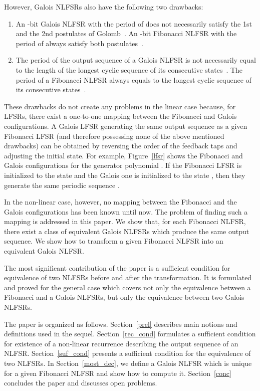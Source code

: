 \documentclass{llncs}
\begin{document}
However, Galois NLFSRs also have the following two drawbacks:
\begin{enumerate}
\item An -bit Galois NLFSR with the period of  does not 
necessarily satisfy the 1st and the 2nd postulates of
Golomb~\cite{DuTT08}. An -bit Fibonacci NLFSR with the period of
 always satisfy both postulates~\cite{Golomb_book}.
\item The period of the output sequence of a Galois NLFSR is not 
necessarily equal to the length of the longest cyclic sequence of its
consecutive states~\cite{DuTT08}. The period of a Fibonacci NLFSR always
equals to the longest cyclic sequence of its
consecutive states~\cite{Golomb_book}.
\end{enumerate}

These drawbacks do not create any problems in the linear
case because, for LFSRs, there exist a one-to-one mapping between 
the Fibonacci and Galois configurations. A Galois LFSR generating the
same output sequence as a given Fibonacci LFSR (and therefore
possessing none of the above mentioned drawbacks) can be obtained by
reversing the order of the feedback taps and adjusting the initial
state. For example, Figure~\ref{lfsr} shows the
Fibonacci and Galois configurations for the generator polynomial . If
the Fibonacci LFSR is initialized to the state  and the Galois
one is initialized to the state , then they generate the same
periodic sequence .

In the non-linear case, however, no mapping between the Fibonacci and
the Galois configurations has been known until now. The problem of
finding such a mapping is addressed in this paper.
We show that, for each Fibonacci NLFSR, there exist a class of
equivalent Galois NLFSRs which produce the same output sequence. 
We show how to transform a given Fibonacci NLFSR into an equivalent
Galois NLFSR. 




The most significant contribution of the paper is a sufficient
condition for equivalence of two NLFSRs before and after
the transformation. It is formulated and proved for the general case which
covers not only the equivalence between a Fibonacci and a Galois
NLFSRs, but only the equivalence between two Galois NLFSRs. 




The paper is organized as follows. Section~\ref{prel} describes main
notions and definitions used in the sequel.  Section~\ref{rec_cond}
formulates a sufficient condition for existence of a non-linear
recurrence describing the output sequence of an NLFSR.
Section~\ref{suf_cond} presents a sufficient condition for the
equivalence of two NLFSRs. In Section~\ref{most_dec}, we define a
 Galois NLFSR which is unique for a given Fibonacci
NLFSR and show how to compute it. 
Section~\ref{conc} concludes the
paper and discusses open problems.
\end{document}

